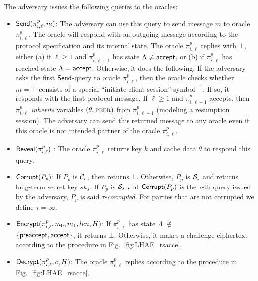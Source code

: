 The adversary issues the following queries to the oracles:
\begin{itemize}
 \item {$\mathsf{Send}(\pi^p_{i, \ell}, m)$:
    The adversary can use this query to send message $m$ to oracle $\pi^p_{i, \ell}$.
    The oracle will respond with an outgoing message according
    to the protocol specification and its internal state.
    The oracle $\pi^p_{i, \ell}$ replies with $\bot$, either
    (a) if $\ell \geq 1$ and $\pi^p_{i, {\ell-1}}$ has state $\Lambda\neq\mathsf{accept}$,
    or
    (b) if $\pi^p_{i,\ell}$ has reached state $\Lambda=\mathsf{accept}$.
    Otherwise, it does the following:
    If the adversary asks the first $\mathsf{Send}$-query to oracle $\pi^p_{i, \ell}$,
    then the oracle checks whether $m = \top$ consists of a special ``initiate client session'' symbol $\top$.
    If so, it responds with the first protocol message.
    If $\ell \geq 1$ and $\pi^p_{i,\ell-1}$ accepts, then $\pi^p_{i,\ell}$ \textit{inherits} variables
    $(\theta,\textsc{peer})$
    from $\pi^p_{i, \ell-1}$ (modeling a resumption session).
    The adversary can send this returned message to any oracle even if this oracle is not intended partner of the oracle $\pi^p_{i, \ell}$.}

 \item {$\mathsf{Reveal}(\pi^p_{i,\ell})$ :
    The oracle $\pi^p_{i,\ell}$ returns key $k$ and cache data $\theta$
    to respond this query. }

 \item {$\mathsf{Corrupt}(P_p)$:
    If $P_p$ is $\mathcal{C}_c$, then returns $\bot$. Otherwise, $P_p$ is $\mathcal{S}_s$ and returns
    long-term secret key $sk_s$.
    If $P_p$ is $\mathcal{S}_s$ and $\mathsf{Corrupt}(P_p)$ is the $\tau$-th query issued by the adversary,
    $P_p$ is said $\tau$-\textit{corrupted}.
    For parties that are not corrupted we define $\tau = \infty$.}

 \item {$\mathsf{Encrypt}(\pi^p_{i,\ell}, m_0, m_1, len, H)$:
    If $\pi^p_{i,\ell}$ has state
    $\Lambda$ $\not\in$ \\ $\{\mathsf{preaccept}, \mathsf{accept}\}$, it returns $\bot$.
    Otherwise, it makes a challenge ciphertext according to the procedure in Fig.~\ref{fig:LHAE_rsacce}.}

 \item {$\mathsf{Decrypt}(\pi^p_{i, \ell}, c, H)$:
    The oracle $\pi^p_{i, \ell}$ replies according to the procedure in Fig.~\ref{fig:LHAE_rsacce}.}
\end{itemize}

